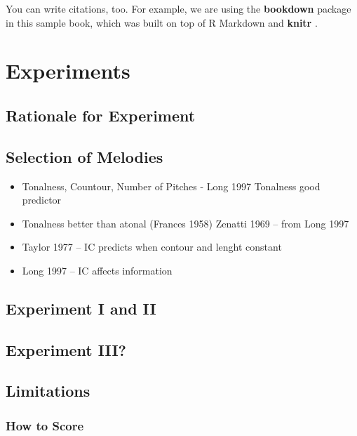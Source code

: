 \documentclass[]{book}
\providecommand{\tightlist}{%
  \setlength{\itemsep}{0pt}\setlength{\parskip}{0pt}}
\theoremstyle{definition}
\theoremstyle{definition}
\theoremstyle{definition}
\theoremstyle{remark}
\begin{document}
You can write citations, too. For example, we are using the
\textbf{bookdown} package \citep{R-bookdown} in this sample book, which
was built on top of R Markdown and \textbf{knitr} \citep{xie2015}.

\hypertarget{experiments}{%
\chapter{Experiments}\label{experiments}}

\hypertarget{rationale-for-experiment}{%
\section{Rationale for Experiment}\label{rationale-for-experiment}}

\hypertarget{selection-of-melodies}{%
\section{Selection of Melodies}\label{selection-of-melodies}}

\begin{itemize}
\tightlist
\item
  Tonalness, Countour, Number of Pitches - Long 1997 Tonalness good
  predictor
\item
  Tonalness better than atonal (Frances 1958) Zenatti 1969 -- from Long
  1997
\item
  Taylor 1977 -- IC predicts when contour and lenght constant
\item
  Long 1997 -- IC affects information
\end{itemize}

\hypertarget{experiment-i-and-ii}{%
\section{Experiment I and II}\label{experiment-i-and-ii}}

\hypertarget{experiment-iii}{%
\section{Experiment III?}\label{experiment-iii}}

\hypertarget{limitations-1}{%
\section{Limitations}\label{limitations-1}}

\hypertarget{how-to-score}{%
\subsection{How to Score}\label{how-to-score}}
\end{document}
